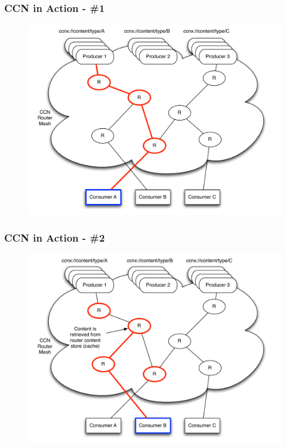 \documentclass[handout]{beamer}
\begin{document}
\begin{frame}
	\frametitle{CCN in Action - \#1}
	\begin{figure}[h]
		\includegraphics[scale=0.4]{ccn_img1.pdf}
	\end{figure}
\end{frame}

\begin{frame}
	\frametitle{CCN in Action - \#2}
	\begin{figure}[h]
		\includegraphics[scale=0.4]{ccn_img2.pdf}
	\end{figure}
\end{frame}
\end{document}
